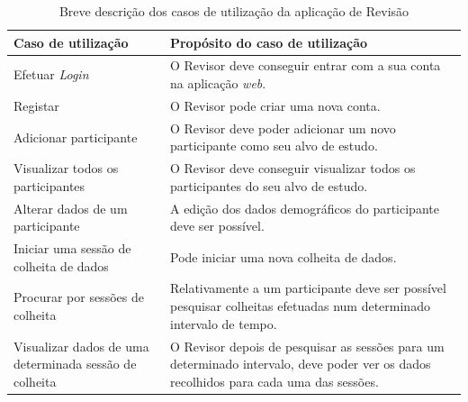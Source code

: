 \begin{table}[H]
\centering

\begin{tabularx}{1\textwidth}{|p{4cm}|p{10.7cm}|}
\rowcolor[HTML]{FFCE93} \hline
{\color[HTML]{000000} \textbf{Caso de utilização}} & {\color[HTML]{000000} \textbf{Propósito do caso de utilização}}  \\
\hline
Efetuar \textit{Login} & O Revisor deve conseguir entrar com a sua conta na aplicação \textit{web}. \\ \hline

Registar & O Revisor pode criar uma nova  conta. \\ \hline

Adicionar participante & O Revisor deve poder adicionar um novo participante como seu alvo de estudo.\\ \hline

Visualizar todos os participantes & O Revisor deve conseguir visualizar todos os participantes do seu alvo de estudo. \\ \hline

Alterar dados de um participante & A edição dos dados demográficos do participante deve ser possível. \\ \hline

Iniciar uma sessão de colheita de dados  & Pode iniciar uma nova colheita de dados. \\ \hline

Procurar por sessões de colheita & Relativamente a um participante deve ser possível  pesquisar colheitas efetuadas num determinado intervalo de tempo. \\ \hline

Visualizar dados de uma determinada sessão de colheita & O Revisor depois de pesquisar as sessões para um determinado intervalo, deve poder ver os dados recolhidos para cada uma das sessões. \\ \hline                        
\end{tabularx}

\caption{Breve descrição dos casos de utilização da aplicação de Revisão}
\label{t:web-usecase}
\end{table}

\cleardoublepage